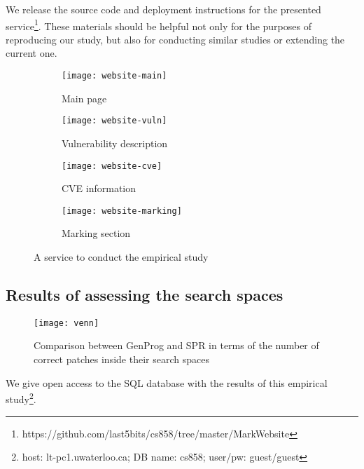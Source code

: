 We release the source code and deployment instructions for the presented service\footnote{https://github.com/last5bits/cs858/tree/master/MarkWebsite}.
These materials should be helpful not only for the purposes of reproducing our study, but also for conducting similar studies or extending the current one.

\begin{figure}[t!]

\begin{subfigure}[b]{\linewidth}
    \texttt{[image: website-main]}
    \caption{Main page}
    \label{figure:website-main}
\end{subfigure}

\begin{subfigure}[b]{\linewidth}
    \texttt{[image: website-vuln]}
    \caption{Vulnerability description}
    \label{figure:website-vuln}
\end{subfigure}

\begin{subfigure}[b]{\linewidth}
    \texttt{[image: website-cve]}
    \caption{CVE information}
    \label{figure:website-cve}
\end{subfigure}

\begin{subfigure}[b]{\linewidth}
    \texttt{[image: website-marking]}
    \caption{Marking section}
    \label{figure:website-marking}
\end{subfigure}

\caption{A service to conduct the empirical study}
\label{figure:website}
\end{figure}

\subsection{Results of assessing the search spaces}

\begin{figure}
    \centering
    \texttt{[image: venn]}
    \caption{Comparison between GenProg and SPR in terms of the number of correct patches inside their search spaces}
    \label{figure:venn}
\end{figure}

We give open access to the SQL database with the results of this empirical study\footnote{host: lt-pc1.uwaterloo.ca; DB name: cs858; user/pw: guest/guest}.
